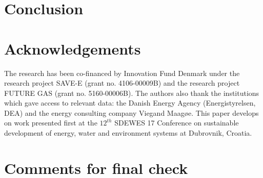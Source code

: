 \documentclass[review]{elsarticle}
\begin{document}

\section{Conclusion} \label{endofpaper}





\section*{Acknowledgements}
The research has been co-financed by Innovation Fund Denmark under the research project SAVE-E (grant no. 4106-00009B) and the research project FUTURE GAS (grant no. 5160-00006B).
The authors also thank the institutions which gave access to relevant data: the Danish Energy Agency (Energistyrelsen, DEA) and the energy consulting company Viegand Maagøe.
This paper develops on work presented first at the $12^{th}$ SDEWES 17 Conference on sustainable development of energy, water and environment systems at Dubrovnik, Croatia.


\section*{Comments for final check}
\end{document}
